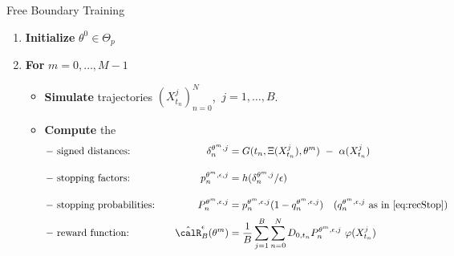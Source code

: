 \begin{algorithm}[t]
\label{alg:FBTrain}
\caption{Free Boundary Training}\label{alg:cap} 
\begin{enumerate}
\setlength \itemsep{0.05ex}
\vspace{-3mm}

\item \textbf{Initialize} $\theta^{0} \in \Theta_p$
\item \textbf{For} $m = 0,\ldots, M-1$
    \begin{itemize}
    \setlength \itemsep{0.4ex}
    \vspace{-2mm}
        \item \textbf{Simulate} trajectories $(X_{t_n}^j)_{n=0}^N$, $\ j=1,\ldots,B$.
        \item %
        \textbf{Compute} the
        \vspace{-3mm}
\begin{align*}
-&\text{ signed distances:} \quad &\delta^{\theta^{m}, j}_n &=  G(t_n,\Xi(X^j_{t_n}),\theta^{m}) \ - \ \alpha(X^j_{t_n}) \\[1em]
-&\text{ stopping factors:}\quad &p^{\theta^{m},\epsilon,j}_{n} &= h(\delta^{\theta^{m}, j}_n/\epsilon) \\[1em]
 -&\text{ stopping probabilities:}\quad &P^{\theta^{m},\epsilon,j}_{n} &= p^{\theta^{m},\epsilon,j}_{n}(1-q^{\theta^{m},\epsilon,j}_{n}) \quad  \text{($q^{\theta^{m},\epsilon,j}_{n}$ as in $\eqref{eq:recStop}$)}\\[0.2em]
    -&\text{ reward function:}\quad &\hat{\calR}_B^{\epsilon}(\theta^{m}) &=  \frac{1}{B}\sum_{j=1}^B  \sum_{n=0}^N D_{0,t_n}   P^{\theta^{m},\epsilon,j}_{n}\ \varphi(X_{t_n}^j)
    \end{align*}


          \vspace{-4mm}
          

\end{itemize}
\end{enumerate}
\end{algorithm}
